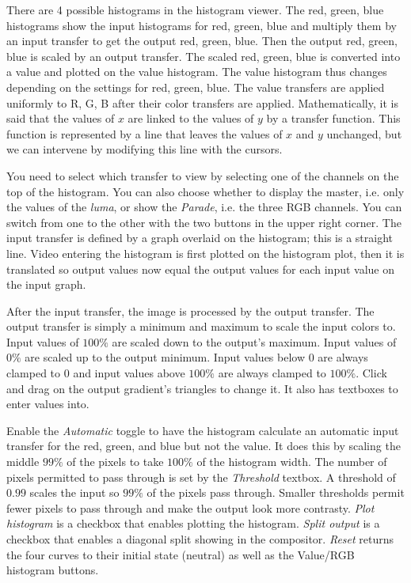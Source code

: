 There are 4 possible histograms in the histogram viewer. The red, green, blue histograms show the input histograms for red, green, blue and multiply them by an input transfer to get the output red, green, blue. Then the output red, green, blue is scaled by an output transfer. The scaled red, green, blue is converted into a value and plotted on the value histogram. The value histogram thus changes depending on the settings for red, green, blue. The value transfers are applied uniformly to R, G, B after their color transfers are applied. Mathematically, it is said that the values of $x$ are linked to the values of $y$ by a transfer function. This function is represented by a line that leaves the values of $x$ and $y$ unchanged, but we can intervene by modifying this line with the cursors. 

You need to select which transfer to view by selecting one of the channels on the top of the histogram. You can also choose whether to display the master, i.e. only the values of the \textit{luma}, or show the \textit{Parade}, i.e. the three RGB channels. You can switch from one to the other with the two buttons in the upper right corner. The input transfer is defined by a graph overlaid on the histogram; this is a straight line. Video entering the histogram is first plotted on the histogram plot, then it is translated so output values now equal the output values for each input value on the input graph.

After the input transfer, the image is processed by the output transfer. The output transfer is simply a minimum and maximum to scale the input colors to. Input values of $100\%$ are scaled down to the output's maximum. Input values of $0\%$ are scaled up to the output minimum. Input values below $0$ are always clamped to $0$ and input values above $100\%$ are always clamped to $100\%$. Click and drag on the output gradient's triangles to change it. It also has textboxes to enter values into.

Enable the \textit{Automatic} toggle to have the histogram calculate an automatic input transfer for the red, green, and blue but not the value. It does this by scaling the middle $99\%$ of the pixels to take $100\%$ of the histogram width. The number of pixels permitted to pass through is set by the \textit{Threshold} textbox. A threshold of $0.99$ scales the input so $99\%$ of the pixels pass through. Smaller thresholds permit fewer pixels to pass through and make the output look more contrasty.
\textit{Plot histogram} is a checkbox that enables plotting the histogram.
\textit{Split output} is a checkbox that enables a diagonal split showing in the compositor. 
\textit{Reset} returns the four curves to their initial state (neutral) as well as the Value/RGB histogram buttons.

